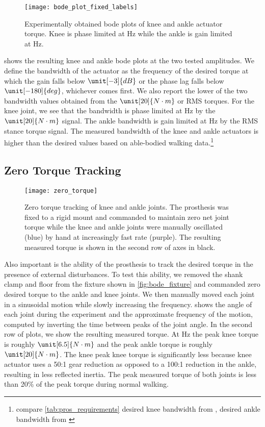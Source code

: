\begin{figure}[htb]
    \centering 
    \texttt{[image: bode\_plot\_fixed\_labels]}
    \caption[Experimentally obtained bode plots of knee and ankle actuator
    torque]{Experimentally obtained bode plots of knee and ankle actuator
    torque. Knee is phase limited at \unit[24]{Hz} while the ankle is gain
    limited at \unit[7]{Hz}.}\label{fig:pros_eval_bode_plots}
\end{figure}
 shows the resulting knee and ankle bode plots at
the two tested amplitudes. We define the bandwidth of the actuator as the
frequency of the desired torque at which the gain falls below $\unit[-3]{dB}$ or
the phase lag falls below $\unit[-180]{deg}$, whichever comes first. We also
report the lower of the two bandwidth values obtained from the $\unit[20]{N
\cdot m}$ or RMS torques. For the knee joint, we see that the bandwidth is phase
limited at \unit[24]{Hz} by the $\unit[20]{N \cdot m}$ signal. The ankle
bandwidth is gain limited at \unit[7]{Hz} by the RMS stance torque signal. The
measured bandwidth of the knee and ankle actuators is higher than the desired
values based on able-bodied walking data.\footnote{compare
\cref{tab:pros_requirements} desired knee bandwidth from
\citep{sergi2012design}, desired ankle bandwidth from \citet{au2008powered}}

\subsection{Zero Torque Tracking}
\begin{figure}[htb]
    \centering 
    \texttt{[image: zero\_torque]}
    \caption[Zero torque tracking of knee and ankle joints]{Zero torque tracking
    of knee and ankle joints. The prosthesis was fixed to a rigid mount and
    commanded to maintain zero net joint torque while the knee and ankle joints
    were manually oscillated (blue) by hand at increasingly fast rate (purple).
    The resulting measured torque is shown in the second row of axes in
    black.}\label{fig:pros_eval_zero_torque}
\end{figure}
Also important is the ability of the prosthesis to track the desired torque in
the presence of external disturbances. To test this ability, we removed the
shank clamp and floor from the fixture shown in \cref{fig:bode_fixture} and
commanded zero desired torque to the ankle and knee joints. We then manually
moved each joint in a sinusoidal motion while slowly increasing the frequency.
 shows the angle of each joint during the
experiment and the approximate frequency of the motion, computed by inverting
the time between peaks of the joint angle. In the second row of plots, we show
the resulting measured torque. At \unit[3]{Hz} the peak knee torque is roughly
$\unit[6.5]{N \cdot m}$ and the peak ankle torque is roughly $\unit[20]{N \cdot
m}$. The knee peak knee torque is significantly less because knee actuator uses
a 50:1 gear reduction as opposed to a 100:1 reduction in the ankle, resulting in
less reflected inertia. The peak measured torque of both joints is less than
20\% of the peak torque during normal walking.

